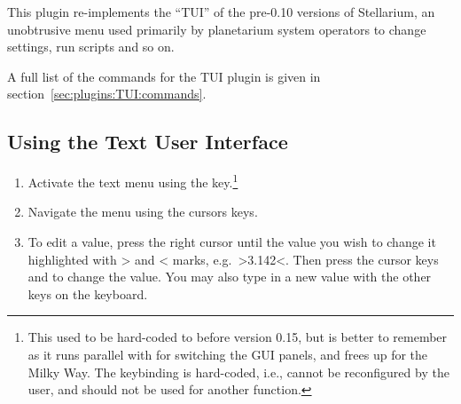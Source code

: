 
This plugin re-implements the ``TUI'' of the pre-0.10 versions of
Stellarium, an unobtrusive menu used primarily by planetarium system
operators to change settings, run scripts and so on.

A full list of the commands for the TUI plugin is
given in section~\ref{sec:plugins:TUI:commands}. 

\subsection{Using the Text User Interface}
\label{sec:plugins:TUI:using}

\begin{enumerate}
\item Activate the text menu using the  key.\footnote{This
    used to be hard-coded to  before version 0.15, but
     is better to remember as it runs parallel with
     for switching the GUI panels, and frees up 
    for the Milky Way. The  keybinding is hard-coded, i.e.,
    cannot be reconfigured by the user, and should not be used for
    another function.}
\item
  Navigate the menu using the cursors keys.
\item
  To edit a value, press the right cursor until the value you wish to
  change it highlighted with \textgreater{} and \textless{} marks, e.g.\
  \textgreater{}3.142\textless{}. Then press the cursor keys \keys{\arrowkeyup} and \keys{\arrowkeydown} to
  change the value. You may also type in a new value with the other keys
  on the keyboard.
\end{enumerate}


